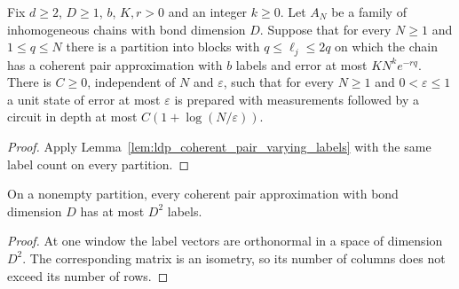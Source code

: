 \begin{lemma}
    \label{lem:ldp_coherent_pair_uniform_rate}
    \leanok
    Fix $d\ge2$, $D\ge1$, $b$, $K,r>0$ and an integer $k\ge0$. Let $A_N$
    be a family of inhomogeneous chains with bond dimension $D$. Suppose
    that for every $N\ge1$ and $1\le q\le N$ there is a partition into blocks
    with $q\le\ell_j\le2q$ on which the chain has a coherent pair
    approximation with $b$ labels and error at most $KN^k e^{-rq}$.
    There is $C\ge0$, independent of $N$ and $\varepsilon$, such that for
    every $N\ge1$ and $0<\varepsilon\le1$ a unit state of error at most
    $\varepsilon$ is prepared with measurements followed by a circuit in
    depth at most $C(1+\log(N/\varepsilon))$.
\end{lemma}
\begin{proof}\leanok
    Apply Lemma~\ref{lem:ldp_coherent_pair_varying_labels} with the same
    label count on every partition.
\end{proof}

\begin{lemma}
    \label{lem:ldp_coherent_pair_label_bound}
    \leanok
    On a nonempty partition, every coherent pair approximation with
    bond dimension $D$ has at most $D^2$ labels.
\end{lemma}
\begin{proof}\leanok
    At one window the label vectors are orthonormal in a space of
    dimension $D^2$. The corresponding matrix is an isometry, so its
    number of columns does not exceed its number of rows.
\end{proof}


